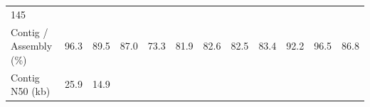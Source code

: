\documentclass[]{elsarticle} %
\begin{document}
\begin{longtable}[]{@{}llllllllllll@{}}
\begin{minipage}[t]{0.05\columnwidth}
145\strut
\end{minipage}\tabularnewline
\begin{minipage}[t]{0.15\columnwidth}\raggedright\strut
Contig / Assembly (\%)\strut
\end{minipage} & \begin{minipage}[t]{0.05\columnwidth}\raggedright\strut
96.3\strut
\end{minipage} & \begin{minipage}[t]{0.05\columnwidth}\raggedright\strut
89.5\strut
\end{minipage} & \begin{minipage}[t]{0.05\columnwidth}\raggedright\strut
87.0\strut
\end{minipage} & \begin{minipage}[t]{0.05\columnwidth}\raggedright\strut
73.3\strut
\end{minipage} & \begin{minipage}[t]{0.05\columnwidth}\raggedright\strut
81.9\strut
\end{minipage} & \begin{minipage}[t]{0.05\columnwidth}\raggedright\strut
82.6\strut
\end{minipage} & \begin{minipage}[t]{0.05\columnwidth}\raggedright\strut
82.5\strut
\end{minipage} & \begin{minipage}[t]{0.05\columnwidth}\raggedright\strut
83.4\strut
\end{minipage} & \begin{minipage}[t]{0.05\columnwidth}\raggedright\strut
92.2\strut
\end{minipage} & \begin{minipage}[t]{0.05\columnwidth}\raggedright\strut
96.5\strut
\end{minipage} & \begin{minipage}[t]{0.05\columnwidth}\raggedright\strut
86.8\strut
\end{minipage}\tabularnewline
\begin{minipage}[t]{0.15\columnwidth}\raggedright\strut
Contig N50 (kb)\strut
\end{minipage} & \begin{minipage}[t]{0.05\columnwidth}\raggedright\strut
25.9\strut
\end{minipage} & \begin{minipage}[t]{0.05\columnwidth}\raggedright\strut
14.9\strut
\end{minipage} & \begin{minipage}[t]{0.05\columnwidth}\raggedright\strut

\end{minipage}
\end{longtable}
\end{document}
